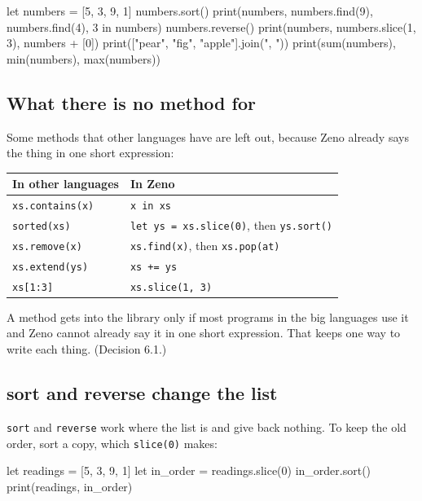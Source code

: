 \begin{zeno}
let numbers = [5, 3, 9, 1]
numbers.sort()
print(numbers, numbers.find(9), numbers.find(4), 3 in numbers)
numbers.reverse()
print(numbers, numbers.slice(1, 3), numbers + [0])
print(["pear", "fig", "apple"].join(", "))
print(sum(numbers), min(numbers), max(numbers))
\end{zeno}

\subsection{What there is no method for}

Some methods that other languages have are left out, because Zeno
already says the thing in one short expression:

\begin{center}
\begin{tabular}{ll}
\toprule
In other languages & In Zeno \\
\midrule
\verb|xs.contains(x)| & \verb|x in xs| \\
\verb|sorted(xs)| & \verb|let ys = xs.slice(0)|, then \verb|ys.sort()| \\
\verb|xs.remove(x)| & \verb|xs.find(x)|, then \verb|xs.pop(at)| \\
\verb|xs.extend(ys)| & \verb|xs += ys| \\
\verb|xs[1:3]| & \verb|xs.slice(1, 3)| \\
\bottomrule
\end{tabular}
\end{center}

\begin{why}
A method gets into the library only if most programs in the big
languages use it and Zeno cannot already say it in one short
expression. That keeps one way to write each thing. (Decision 6.1.)
\end{why}

\subsection{sort and reverse change the list}

\verb|sort| and \verb|reverse| work where the list is and give back
nothing. To keep the old order, sort a copy, which \verb|slice(0)|
makes:

\begin{zeno}
let readings = [5, 3, 9, 1]
let in_order = readings.slice(0)
in_order.sort()
print(readings, in_order)
\end{zeno}

